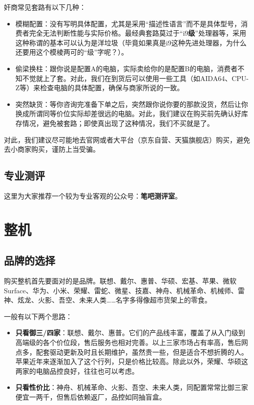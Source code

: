 \documentclass[../main.tex]{subfiles}
\begin{document}
奸商常见套路有以下几种：
\begin{itemize}
  \item 模糊配置：没有写明具体配置，尤其是采用“描述性语言”而不是具体型号，消费者完全无法判断性能与实际价格。最经典套路莫过于“i9\textbf{级}”处理器等，采用这种称谓的基本可以认为是洋垃圾（毕竟如果真是i9这种先进处理器，为什么还要用这个模棱两可的“级”字呢？）。
  \item 偷梁换柱：跟你说是配置A的电脑，实际卖给你的是配置B的电脑，消费者不知不觉就上了套。对此，我们在到货后可以使用一些工具（如AIDA64、CPU-Z等）来检查电脑的具体配置，确保与商家所说的一致。
  \item 突然缺货：等你咨询完准备下单之后，突然跟你说你要的那款没货，然后让你换成所谓同等价位实际却差很远的电脑。对此，我们建议在购买前先确认好库存情况，避免被套路；即使真出现了这种情况，我们不买就是了。
\end{itemize}
对此，我们建议尽可能地去官网或者大平台（京东自营、天猫旗舰店）购买，避免去小商家购买，谨防上当受骗。

\subsection{专业测评}

这里为大家推荐一个较为专业客观的公众号：\textbf{笔吧测评室}。

\section{整机}

\subsection{品牌的选择}

购买整机首先要面对的是品牌。联想、戴尔、惠普、华硕、宏基、苹果、微软 Surface、华为、小米、荣耀、雷蛇、微星、技嘉、神舟、机械革命、机械师、雷神、炫龙、火影、吾空、未来人类……名字多得像超市货架上的零食。

一般有以下两个思路：

\begin{itemize}
  \item \textbf{只看御三/四家}：联想、戴尔、惠普。它们的产品线丰富，覆盖了从入门级到高端级的各个价位段，售后服务也相对完善。以上三家市场占有率高，售后网点多，配套驱动更新及时且长期维护，虽然贵一些，但是适合不想折腾的人。苹果近年来逐渐加入了这个行列，只是价格比较高。除此以外，荣耀、华硕这两家的电脑品控良好，往往也可以考虑。
  \item \textbf{只看性价比}：神舟、机械革命、火影、吾空、未来人类，同配置常常比御三家便宜一两千，但售后依赖返厂，品控如同抽盲盒。
\end{itemize}
\end{document}
